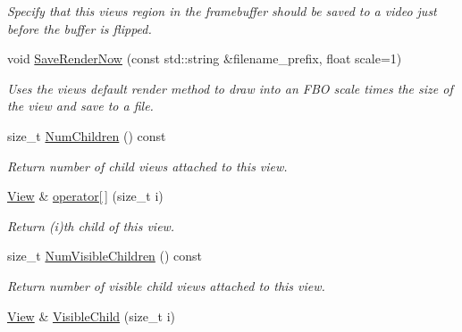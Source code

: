 \begin{DoxyCompactItemize}
\begin{DoxyCompactList}\small\item\em Specify that this views region in the framebuffer should be saved to a video just before the buffer is flipped. \end{DoxyCompactList}\item 
void \hyperlink{structpangolin_1_1_view_a63e4b9ddc178ec09d8262c4f1693a6fe}{Save\+Render\+Now} (const std\+::string \&filename\+\_\+prefix, float scale=1)
\begin{DoxyCompactList}\small\item\em Uses the views default render method to draw into an F\+BO \textquotesingle{}scale\textquotesingle{} times the size of the view and save to a file. \end{DoxyCompactList}\item 
size\+\_\+t \hyperlink{structpangolin_1_1_view_a9b0e04e013e1e277765faf7c517fcab0}{Num\+Children} () const \hypertarget{structpangolin_1_1_view_a9b0e04e013e1e277765faf7c517fcab0}{}\label{structpangolin_1_1_view_a9b0e04e013e1e277765faf7c517fcab0}

\begin{DoxyCompactList}\small\item\em Return number of child views attached to this view. \end{DoxyCompactList}\item 
\hyperlink{structpangolin_1_1_view}{View} \& \hyperlink{structpangolin_1_1_view_aa6bf61cec2832c355364da80a71fa5eb}{operator\mbox{[}$\,$\mbox{]}} (size\+\_\+t i)\hypertarget{structpangolin_1_1_view_aa6bf61cec2832c355364da80a71fa5eb}{}\label{structpangolin_1_1_view_aa6bf61cec2832c355364da80a71fa5eb}

\begin{DoxyCompactList}\small\item\em Return (i)th child of this view. \end{DoxyCompactList}\item 
size\+\_\+t \hyperlink{structpangolin_1_1_view_a0ac92c4043b56327ffd9dd1630fc6eeb}{Num\+Visible\+Children} () const \hypertarget{structpangolin_1_1_view_a0ac92c4043b56327ffd9dd1630fc6eeb}{}\label{structpangolin_1_1_view_a0ac92c4043b56327ffd9dd1630fc6eeb}

\begin{DoxyCompactList}\small\item\em Return number of visible child views attached to this view. \end{DoxyCompactList}\item 
\hyperlink{structpangolin_1_1_view}{View} \& \hyperlink{structpangolin_1_1_view_ae405a48f6799ea2fcdbc56db972aeaf7}{Visible\+Child} (size\+\_\+t i)\hypertarget{structpangolin_1_1_view_ae405a48f6799ea2fcdbc56db972aeaf7}{}\label{structpangolin_1_1_view_ae405a48f6799ea2fcdbc56db972aeaf7}


\end{DoxyCompactItemize}
